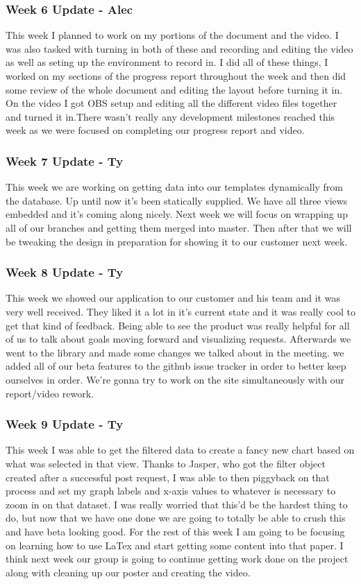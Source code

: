 \subsubsection{Week 6 Update - Alec}
This week I planned to work on my portions of the document and the video.
I was also tasked with turning in both of these and recording and editing the video as well as seting up the environment to record in.
I did all of these things, I worked on my sections of the progress report throughout the week and then did some review of the whole document and editing the layout before turning it in.
On the video I got OBS setup and editing all the different video files together and turned it in.
​There wasn't really any development milestones reached ​​this week as we were focused on completing our progress report and video.

\subsubsection{Week 7 Update - Ty}
This week we are working on getting data into our templates dynamically from the database.
Up until now it's been statically supplied.
We have all three views embedded and it's coming along nicely.
Next week we will focus on wrapping up all of our branches and getting them merged into master.
Then after that we will be tweaking the design in preparation for showing it to our customer next week.​

\subsubsection{Week 8 Update - Ty}
This week we showed our application to our customer and his team and it was very well received.
They liked it a lot in it's current state and it was really cool to get that kind of feedback.
Being able to see the product was really helpful for all of us to talk about goals moving forward and visualizing requests.
​Afterwards we went to the library and made some changes we talked about in the meeting.
we added all of our beta features to the github issue tracker in order to better keep ourselves in order.
We're gonna try to work on the site simultaneously with our report/video rework.

\subsubsection{Week 9 Update - Ty}
This week I was able to get the filtered data to create a fancy new chart based on what was selected in that view.
Thanks to Jasper, who got the filter object created after a successful post request, I was able to then piggyback on that process and set my graph labels and x-axis values to whatever is necessary to zoom in on that dataset.
I was really worried that this'd be the hardest thing to do, but now that we have one done we are going to totally be able to crush this and have beta looking good.
For the rest of this week I am going to be focusing on learning how to use LaTex and start getting some content into that paper.
I think next week​ our group is going to continue getting work done on the project along with cleaning up our poster and creating the video.

